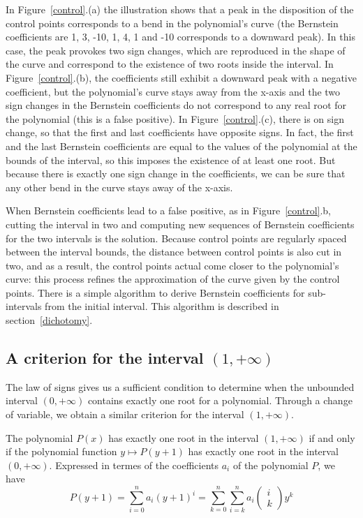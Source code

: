 \documentclass{article}
\begin{document}
In Figure~{\ref{control}.(a)} the illustration shows that a peak in
the disposition of the control points corresponds to a bend in the
polynomial's curve (the Bernstein coefficients are 1, 3, -10, 1, 4, 1
and -10 corresponds to a downward peak).  In this case, the peak
provokes two sign changes, which are reproduced in the shape of the
curve and correspond to the existence of two roots inside the
interval.  In Figure~\ref{control}.(b), the coefficients still exhibit
a downward peak with a negative coefficient, but the polynomial's
curve stays away from the x-axis and the two sign changes in the
Bernstein coefficients do not correspond to any real root for the
polynomial (this is a false positive).  In Figure~\ref{control}.(c),
there is on sign change, so that the first and last coefficients have
opposite signs.  In fact, the first and the last Bernstein
coefficients are equal to the values of the polynomial at the bounds
of the interval, so this imposes the existence of at least one root.
But because there is exactly one sign change in the coefficients, we
can be sure that any other bend in the curve stays away of the x-axis.

When Bernstein coefficients lead to a false positive, as in
Figure~{\ref{control}.b}, cutting the interval in two and computing
new sequences of Bernstein coefficients for the two intervals is the
solution.  Because control points are regularly spaced between the
interval bounds, the distance between control points is also cut in
two, and as a result, the control points actual come closer to the polynomial's
curve: this process refines the approximation of the curve given by the
control points.  There is a simple algorithm to derive Bernstein coefficients
for sub-intervals from the initial interval.  This algorithm is described in
section~\ref{dichotomy}.

\subsection{A criterion for the interval \((1,+\infty)\)}
The law of signs gives us a sufficient condition to determine when the
unbounded interval \((0,+\infty)\) contains exactly one root for a
polynomial. Through a change of variable, we obtain a similar
criterion for the interval \((1, +\infty)\).

 The polynomial \(P(x)\)
has exactly one root in the interval \((1,+\infty)\) if and only if
the polynomial function \(y \mapsto P(y+1)\) has exactly one root in
the interval \((0,+\infty)\). Expressed in termes of the
coefficients \(a_i\) of the polynomial
\(P\), we have \[P(y+1)= \sum_{i=0}^{n} a_i (y+1)^i = \sum_{k=0}^{n}
\sum_{i=k}^{n}a_i\left(\begin{array}{c}i\\k\end{array}\right) y^k\]
\end{document}
